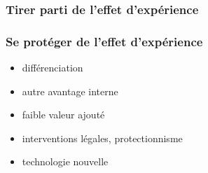 			\subsubsection{Tirer parti de l'effet d'expérience}
			
		
		
			\subsubsection{Se protéger de l'effet d'expérience}
		\begin{itemize}
			\item différenciation
			\item autre avantage interne
			\item faible valeur ajouté
			\item interventions légales, protectionnisme
			\item technologie nouvelle
		\end{itemize}
		